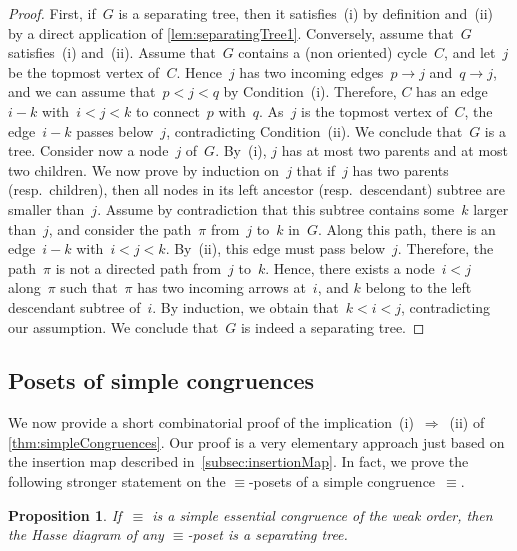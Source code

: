 \documentclass{amsart}
\newtheorem{proposition}[theorem]{Proposition}
\theoremstyle{definition}
\begin{document}
\begin{proof}
First, if~$G$ is a separating tree, then it satisfies~(i) by definition and~(ii) by a direct application of \cref{lem:separatingTree1}.
Conversely, assume that~$G$ satisfies~(i) and~(ii).
Assume that~$G$ contains a (non oriented) cycle~$C$, and let~$j$ be the topmost vertex of~$C$.
Hence~$j$ has two incoming edges~$p \to j$ and~$q \to j$, and we can assume that~$p < j < q$ by Condition~(i).
Therefore, $C$ has an edge~$i-k$ with~$i < j < k$ to connect~$p$ with~$q$.
As~$j$ is the topmost vertex of~$C$, the edge~$i-k$ passes below~$j$, contradicting Condition~(ii).
We conclude that~$G$ is a tree.
Consider now a node~$j$ of~$G$.
By~(i), $j$ has at most two parents and at most two children.
We now prove by induction on~$j$ that if~$j$ has two parents (resp.~children), then all nodes in its left ancestor (resp.~descendant) subtree are smaller than~$j$.
Assume by contradiction that this subtree contains some~$k$ larger than~$j$, and consider the path~$\pi$ from~$j$ to~$k$ in~$G$.
Along this path, there is an edge~$i - k$ with~$i < j < k$.
By~(ii), this edge must pass below~$j$.
Therefore, the path~$\pi$ is not a directed path from~$j$ to~$k$.
Hence, there exists a node~$i < j$ along~$\pi$ such that~$\pi$ has two incoming arrows at~$i$, and $k$ belong to the left descendant subtree of~$i$.
By induction, we obtain that~$k < i < j$, contradicting our assumption.
We conclude that~$G$ is indeed a separating tree.
\end{proof}


\subsection{Posets of simple congruences}
\label{subsec:posetsSimpleCongruences}

We now provide a short combinatorial proof of the implication~(i)~$\Longrightarrow$~(ii) of \cref{thm:simpleCongruences}.
Our proof is a very elementary approach just based on the insertion map described in~\cref{subsec:insertionMap}.
In fact, we prove the following stronger statement on the $\equiv$-posets of a simple congruence~$\equiv$.

\begin{proposition}
\label{prop:simpleImpliesSeparatingTrees}
If~$\equiv$ is a simple essential congruence of the weak order, then the Hasse diagram of any $\equiv$-poset is a separating tree.
\end{proposition}
\end{document}
